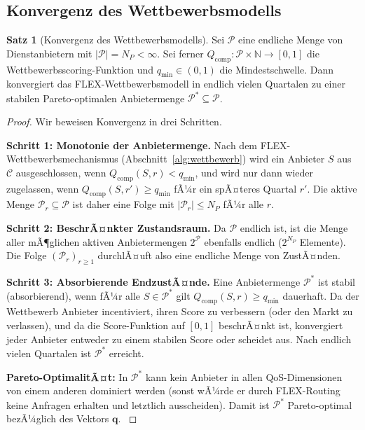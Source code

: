 ﻿\documentclass[a4paper,12pt]{article}
\theoremstyle{definition}
\newtheorem{satz}{Satz}
\begin{document}
\subsection{Konvergenz des Wettbewerbsmodells}

\begin{satz}[Konvergenz des Wettbewerbsmodells]
\label{satz:konvergenz}
Sei $\mathcal{P}$ eine endliche Menge von Dienstanbietern mit $|\mathcal{P}| = N_P < \infty$. Sei ferner $Q_\mathrm{comp}: \mathcal{P} \times \mathbb{N} \to [0,1]$ die Wettbewerbsscoring-Funktion und $q_\mathrm{min} \in (0,1)$ die Mindestschwelle. Dann konvergiert das FLEX-Wettbewerbsmodell in endlich vielen Quartalen zu einer stabilen Pareto-optimalen Anbietermenge $\mathcal{P}^* \subseteq \mathcal{P}$.
\end{satz}

\begin{proof}
Wir beweisen Konvergenz in drei Schritten.

\textbf{Schritt 1: Monotonie der Anbietermenge.} Nach dem FLEX-Wettbewerbsmechanismus (Abschnitt~\ref{alg:wettbewerb}) wird ein Anbieter $S$ aus $\mathcal{C}$ ausgeschlossen, wenn $Q_\mathrm{comp}(S, r) < q_\mathrm{min}$, und wird nur dann wieder zugelassen, wenn $Q_\mathrm{comp}(S, r') \geq q_\mathrm{min}$ fÃ¼r ein spÃ¤teres Quartal $r'$. Die aktive Menge $\mathcal{P}_r \subseteq \mathcal{P}$ ist daher eine Folge mit $|\mathcal{P}_r| \leq N_P$ fÃ¼r alle $r$.

\textbf{Schritt 2: BeschrÃ¤nkter Zustandsraum.} Da $\mathcal{P}$ endlich ist, ist die Menge aller mÃ¶glichen aktiven Anbietermengen $2^{\mathcal{P}}$ ebenfalls endlich ($2^{N_P}$ Elemente). Die Folge $(\mathcal{P}_r)_{r \geq 1}$ durchlÃ¤uft also eine endliche Menge von ZustÃ¤nden.

\textbf{Schritt 3: Absorbierende EndzustÃ¤nde.} Eine Anbietermenge $\mathcal{P}^*$ ist stabil (absorbierend), wenn fÃ¼r alle $S \in \mathcal{P}^*$ gilt $Q_\mathrm{comp}(S, r) \geq q_\mathrm{min}$ dauerhaft. Da der Wettbewerb Anbieter incentiviert, ihren Score zu verbessern (oder den Markt zu verlassen), und da die Score-Funktion auf $[0,1]$ beschrÃ¤nkt ist, konvergiert jeder Anbieter entweder zu einem stabilen Score oder scheidet aus. Nach endlich vielen Quartalen ist $\mathcal{P}^*$ erreicht.

\textbf{Pareto-OptimalitÃ¤t:} In $\mathcal{P}^*$ kann kein Anbieter in allen QoS-Dimensionen von einem anderen dominiert werden (sonst wÃ¼rde er durch FLEX-Routing keine Anfragen erhalten und letztlich ausscheiden). Damit ist $\mathcal{P}^*$ Pareto-optimal bezÃ¼glich des Vektors $\mathbf{q}$. $
$
\end{proof}
\end{document}
